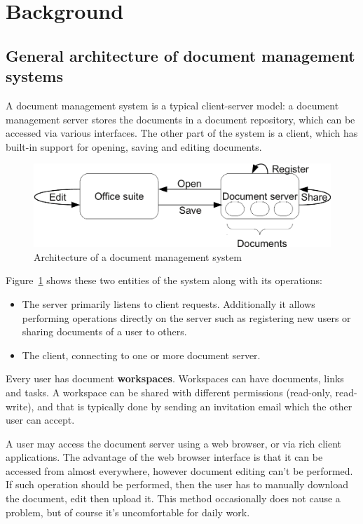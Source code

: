 \section{Background}

\subsection{General architecture of document management systems}

A document management system is a typical client-server model: a document
management server stores the documents in a document repository, which can be
accessed via various interfaces.  The other part of the system is a client,
which has built-in support for opening, saving and editing documents.

\begin{figure}[H]
\centering
\includegraphics[width=450px,keepaspectratio]{general-arch-of-doc-mgmt-systems.pdf}
\caption{Architecture of a document management system}
\label{fig:general-arch-of-doc-mgmt-systems}
\end{figure}

Figure~\ref{fig:general-arch-of-doc-mgmt-systems} shows these two entities of
the system along with its operations:

\begin{itemize}
\item The server primarily listens to client requests. Additionally it allows
performing operations directly on the server such as registering new users or
sharing documents of a user to others.
\item The client, connecting to one or more document server.
\end{itemize}

Every user has document \textbf{workspaces}. Workspaces can have documents,
links and tasks. A workspace can be shared with different permissions
(read-only, read-write), and that is typically done by sending an invitation
email which the other user can accept.

A user may access the document server using a web browser, or via rich client
applications. The advantage of the web browser interface is that it can be
accessed from almost everywhere, however document editing can't be performed.
If such operation should be performed, then the user has to manually download
the document, edit then upload it. This method occasionally does not cause a
problem, but of course it's uncomfortable for daily work.

